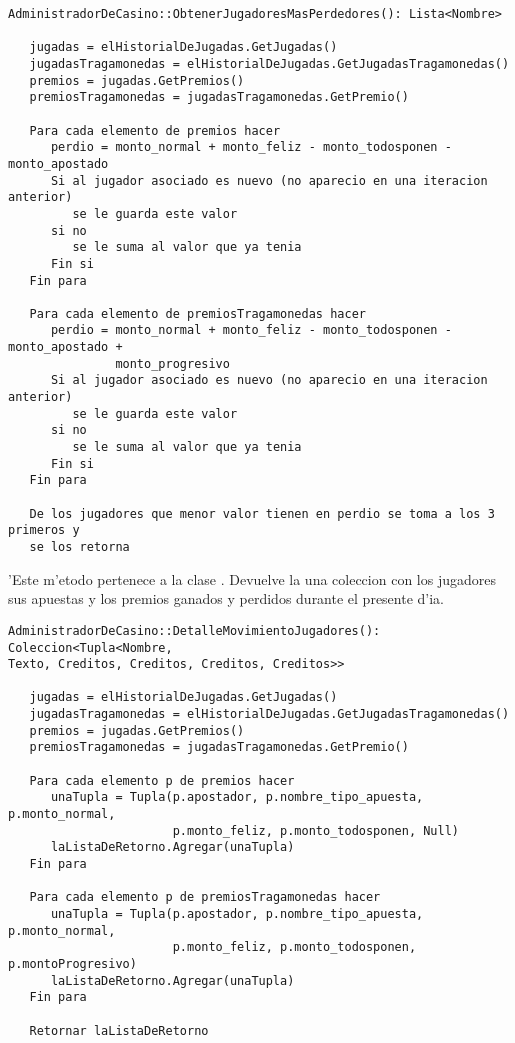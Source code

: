 \begin{verbatim}
AdministradorDeCasino::ObtenerJugadoresMasPerdedores(): Lista<Nombre>
	
   jugadas = elHistorialDeJugadas.GetJugadas()
   jugadasTragamonedas = elHistorialDeJugadas.GetJugadasTragamonedas()
   premios = jugadas.GetPremios()
   premiosTragamonedas = jugadasTragamonedas.GetPremio()

   Para cada elemento de premios hacer
      perdio = monto_normal + monto_feliz - monto_todosponen - monto_apostado
      Si al jugador asociado es nuevo (no aparecio en una iteracion anterior)
         se le guarda este valor
      si no
         se le suma al valor que ya tenia
      Fin si
   Fin para

   Para cada elemento de premiosTragamonedas hacer
      perdio = monto_normal + monto_feliz - monto_todosponen - monto_apostado +
               monto_progresivo
      Si al jugador asociado es nuevo (no aparecio en una iteracion anterior)
         se le guarda este valor
      si no
         se le suma al valor que ya tenia
      Fin si
   Fin para

   De los jugadores que menor valor tienen en perdio se toma a los 3 primeros y
   se los retorna
\end{verbatim}



'Este m'etodo pertenece a la clase . Devuelve la una coleccion con los jugadores sus apuestas y los premios ganados y perdidos durante el presente d'ia.

\begin{verbatim}
AdministradorDeCasino::DetalleMovimientoJugadores(): Coleccion<Tupla<Nombre,
Texto, Creditos, Creditos, Creditos, Creditos>>

   jugadas = elHistorialDeJugadas.GetJugadas()
   jugadasTragamonedas = elHistorialDeJugadas.GetJugadasTragamonedas()
   premios = jugadas.GetPremios()
   premiosTragamonedas = jugadasTragamonedas.GetPremio()

   Para cada elemento p de premios hacer
      unaTupla = Tupla(p.apostador, p.nombre_tipo_apuesta, p.monto_normal,
                       p.monto_feliz, p.monto_todosponen, Null)
      laListaDeRetorno.Agregar(unaTupla)
   Fin para

   Para cada elemento p de premiosTragamonedas hacer
      unaTupla = Tupla(p.apostador, p.nombre_tipo_apuesta, p.monto_normal,
                       p.monto_feliz, p.monto_todosponen, p.montoProgresivo)
      laListaDeRetorno.Agregar(unaTupla)
   Fin para

   Retornar laListaDeRetorno
\end{verbatim}
